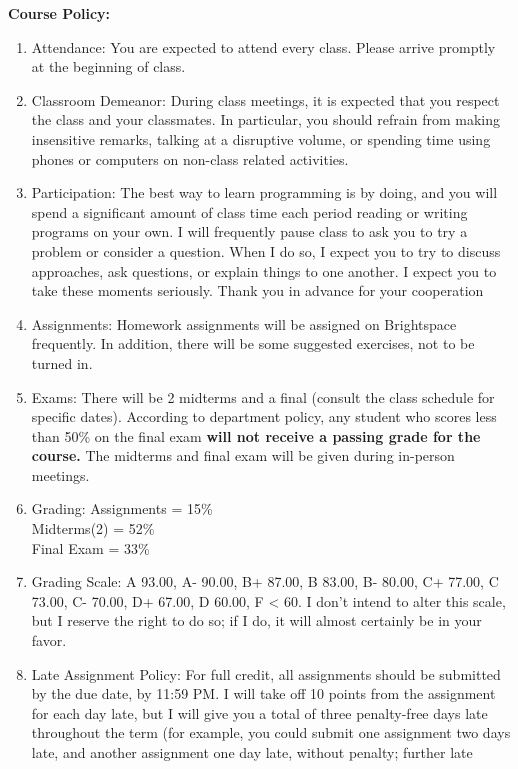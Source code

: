 \documentclass[a4paper]{article}
\begin{document}
\newpage
\textbf{Course Policy:}
\begin{enumerate}
    \item Attendance: You are expected to attend every class. Please arrive promptly at the beginning of
    class.
    \item Classroom Demeanor: During class meetings, it is expected that you respect the class and your
    classmates. In particular, you should refrain from making insensitive remarks, talking at a
    disruptive volume, or spending time using phones or computers on non-class related activities.
    \item Participation: The best way to learn programming is by doing, and you will spend a significant
    amount of class time each period reading or writing programs on your own. I will frequently
    pause class to ask you to try a problem or consider a question. When I do so, I expect you to try
    to discuss approaches, ask questions, or explain things to one another. I expect you to take these
    moments seriously. Thank you in advance for your cooperation
    \item Assignments: Homework assignments will be assigned on Brightspace frequently. In addition,
    there will be some suggested exercises, not to be turned in.
    \item Exams: There will be 2 midterms and a final (consult the class schedule for specific dates).
    According to department policy, any student who scores less than 50\% on the final exam \textbf{will
    not receive a passing grade for the course.} The midterms and final exam will be given
    during in-person meetings.
    \item Grading:
    Assignments = 15\% \\
    Midterms(2) = 52\% \\ 
    Final Exam = 33\%
    \item Grading Scale: A 93.00, A- 90.00, B+ 87.00, B 83.00, B- 80.00, C+ 77.00, C 73.00, C- 70.00, D+
    67.00, D 60.00, F < 60. I don't intend to alter this scale, but I reserve the right to do so; if I do,
    it will almost certainly be in your favor.
    \item Late Assignment Policy: For full credit, all assignments should be submitted by the due date, by
    11:59 PM. I will take off 10 points from the assignment for each day late, but I will give you a
    total of three penalty-free days late throughout the term (for example, you could submit one
    assignment two days late, and another assignment one day late, without penalty; further late

\end{enumerate}
\end{document}
